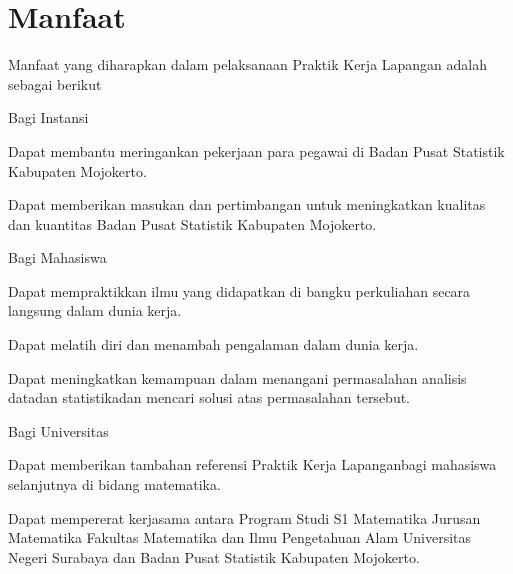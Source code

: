 \section{Manfaat}
Manfaat  yang  diharapkan  dalam  pelaksanaan Praktik  Kerja  Lapangan adalah sebagai berikut
\begin{daftar}
	\item Bagi Instansi
	\begin{subdaftar}
		\item Dapat  membantu  meringankan  pekerjaan  para  pegawai  di Badan Pusat Statistik Kabupaten Mojokerto.
		\item Dapat memberikan  masukan dan pertimbangan untuk meningkatkan kualitas dan kuantitas Badan Pusat Statistik Kabupaten Mojokerto.
	\end{subdaftar}
	\item Bagi Mahasiswa
	\begin{subdaftar}
		\item Dapat mempraktikkan  ilmu  yang  didapatkan  di  bangku  perkuliahan secara langsung dalam dunia kerja.
		\item Dapat melatih diri dan menambah pengalaman dalam dunia kerja.
		\item Dapat  meningkatkan  kemampuan  dalam  menangani  permasalahan analisis  datadan  statistikadan  mencari  solusi  atas  permasalahan tersebut.
	\end{subdaftar}
	\item Bagi Universitas
	\begin{subdaftar}
		\item Dapat memberikan tambahan referensi Praktik Kerja Lapanganbagi mahasiswa selanjutnya di bidang matematika.
		\item Dapat  mempererat  kerjasama  antara  Program  Studi  S1  Matematika Jurusan  Matematika Fakultas Matematika  dan  Ilmu  Pengetahuan Alam Universitas   Negeri   Surabaya dan Badan   Pusat   Statistik Kabupaten Mojokerto.
	\end{subdaftar}
\end{daftar}